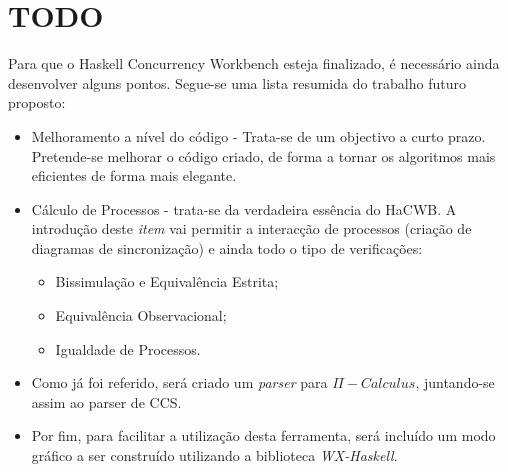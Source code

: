 \section{TODO}

Para que o Haskell Concurrency Workbench esteja finalizado, é necessário ainda desenvolver alguns pontos. 
Segue-se uma lista resumida do trabalho futuro proposto:
\begin{itemize}
\item Melhoramento a nível do código - Trata-se de um objectivo a curto prazo. Pretende-se melhorar o código criado, 
de forma a tornar os algoritmos mais eficientes de forma mais elegante.
\item Cálculo de Processos - trata-se da verdadeira essência do HaCWB. A introdução deste \textit{item} 
vai permitir a interacção de processos (criação de diagramas de sincronização) e ainda todo o tipo de verificações:
\begin{itemize}
\item Bissimulação e Equivalência Estrita;
\item Equivalência Observacional;
\item Igualdade de Processos.
\end{itemize}
\item Como já foi referido, será criado um \textit{parser} para \textit{$\Pi-Calculus$}, juntando-se assim ao 
parser de CCS.
\item Por fim, para facilitar a utilização desta ferramenta, será incluído um modo gráfico a ser construído utilizando 
a biblioteca \textit{WX-Haskell}.
\end{itemize}
